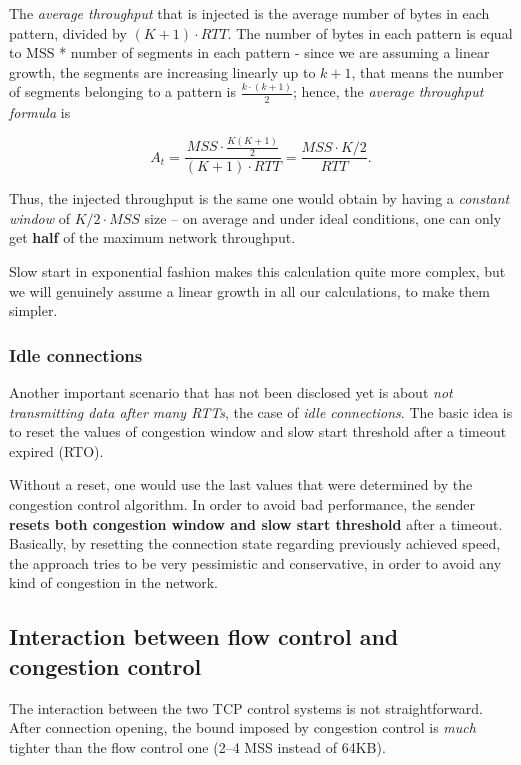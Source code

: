 \documentclass[10pt]{\classname}
\begin{document}
The \emph{average throughput} that is injected is the average number of bytes in each
pattern, divided by $(K + 1)\cdot RTT$. The number of bytes in each pattern is
equal to MSS * number of segments in each pattern \-- since we are assuming a
linear growth, the segments are increasing linearly up to $k+1$, that means the
number of segments belonging to a pattern is $\frac{k \cdot (k + 1)}{2}$;
hence, the \emph{average throughput formula} is

$$A_t = \frac{MSS\cdot \frac{K(K+1)}{2}}{(K+1)\cdot RTT} = \frac{MSS\cdot
K/2}{RTT}.$$ 

Thus, the injected throughput is the same one would obtain by
having a \emph{constant window} of $K/2 \cdot MSS$ size \--- on average and
under ideal conditions, one can only get \textbf{half} of the maximum network
throughput.

Slow start in exponential fashion makes this calculation quite more complex,
but we will genuinely assume a linear growth in all our calculations, to make
them simpler.

\subsubsection{Idle connections}

Another important scenario that has not been disclosed yet is about \emph{not
transmitting data after many RTTs}, the case of \emph{idle connections}. The
basic idea is to reset the values of congestion window and slow start threshold
after a timeout expired (RTO).

Without a reset, one would use the last values that were determined by the
congestion control algorithm. In order to avoid bad performance, the sender
\textbf{resets both congestion window and slow start threshold} after a
timeout. Basically, by resetting the connection state regarding previously
achieved speed, the approach tries to be very pessimistic and conservative, in
order to avoid any kind of congestion in the network.

\subsection{Interaction between flow control and congestion control}

The interaction between the two TCP control systems is not straightforward.
After connection opening, the bound imposed by congestion control is
\emph{much} tighter than the flow control one (2--4 MSS instead of 64KB).
\end{document}
